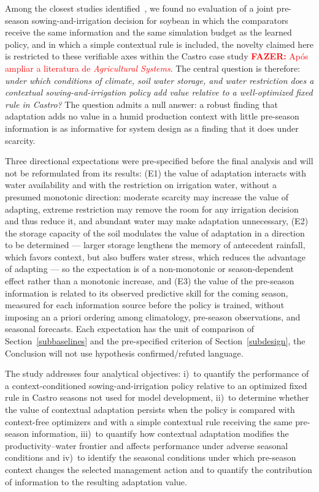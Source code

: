 \documentclass[times,final,authoryear]{elsarticle}
\begin{document}
Among the closest studies identified~\citep{kelly2024assessing, balderas2025comparative, noa2026hybrid}, we found no evaluation of a joint pre-season sowing-and-irrigation decision for soybean in which the comparators receive the same information and the same simulation budget as the learned policy, and in which a simple contextual rule is included, the novelty claimed here is restricted to these verifiable axes within the Castro case study \textcolor{red}{\textbf{FAZER:} Após ampliar a literatura de \textit{Agricultural Systems}}. The central question is therefore: \emph{under which conditions of climate, soil water storage, and water restriction does a contextual sowing-and-irrigation policy add value relative to a well-optimized fixed rule in Castro?} The question admits a null answer: a robust finding that adaptation adds no value in a humid production context with little pre-season information is as informative for system design as a finding that it does under scarcity.

Three directional expectations were pre-specified before the final analysis and will not be reformulated from its results: (E1) the value of adaptation interacts with water availability and with the restriction on irrigation water, without a presumed monotonic direction: moderate scarcity may increase the value of adapting, extreme restriction may remove the room for any irrigation decision and thus reduce it, and abundant water may make adaptation unnecessary, (E2) the storage capacity of the soil modulates the value of adaptation in a direction to be determined --- larger storage lengthens the memory of antecedent rainfall, which favors context, but also buffers water stress, which reduces the advantage of adapting --- so the expectation is of a non-monotonic or season-dependent effect rather than a monotonic increase, and (E3) the value of the pre-season information is related to its observed predictive skill for the coming season, measured for each information source before the policy is trained, without imposing an a priori ordering among climatology, pre-season observations, and seasonal forecasts. Each expectation has the unit of comparison of Section~\ref{subbaselines} and the pre-specified criterion of Section~\ref{subdesign}, the Conclusion will not use hypothesis confirmed/refuted language.

The study addresses four analytical objectives: i)~to quantify the performance of a context-conditioned sowing-and-irrigation policy relative to an optimized fixed rule in Castro seasons not used for model development, ii)~to determine whether the value of contextual adaptation persists when the policy is compared with context-free optimizers and with a simple contextual rule receiving the same pre-season information, iii)~to quantify how contextual adaptation modifies the productivity--water frontier and affects performance under adverse seasonal conditions and iv)~to identify the seasonal conditions under which pre-season context changes the selected management action and to quantify the contribution of information to the resulting adaptation value.
\end{document}
